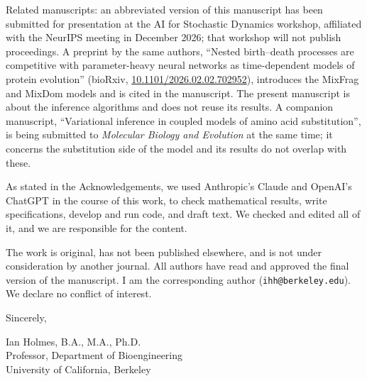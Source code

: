 \documentclass[11pt]{article}
\begin{document}
Related manuscripts: an abbreviated version of this manuscript has been
submitted for presentation at the AI for Stochastic Dynamics workshop, affiliated
with the NeurIPS meeting in December 2026; that workshop will not publish
proceedings. A preprint by the
same authors, ``Nested birth--death processes are competitive with
parameter-heavy neural networks as time-dependent models of protein
evolution'' (bioRxiv,
\href{https://doi.org/10.1101/2026.02.02.702952}{10.1101/2026.02.02.702952}),
introduces the MixFrag and MixDom models and is cited in the manuscript. The
present manuscript is about the inference algorithms and does not reuse its
results. A companion manuscript, ``Variational inference in coupled models of
amino acid substitution'', is being submitted to \emph{Molecular Biology and
Evolution} at the same time; it concerns the substitution side of the model and
its results do not overlap with these.

As stated in the Acknowledgements, we used Anthropic's Claude and OpenAI's
ChatGPT in the course of this work, to check mathematical results, write specifications,
develop and run code, and draft text. We checked and edited all of it, and we
are responsible for the content.

The work is original, has not been published elsewhere, and is not under
consideration by another journal. All authors have read and approved the final
version of the manuscript. I am the corresponding author
(\texttt{ihh@berkeley.edu}). We declare no conflict of interest.

Sincerely,

\vspace{1em}

Ian Holmes, B.A., M.A., Ph.D.\\
Professor, Department of Bioengineering\\
University of California, Berkeley
\end{document}
